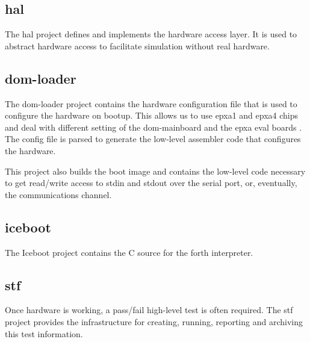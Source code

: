 \documentclass{article}
\begin{document}
	\subsection{hal}

The hal project defines and implements the hardware access layer.  
It is used to 
abstract hardware access to facilitate simulation
without real hardware.

	\subsection{dom-loader}

The dom-loader project contains the hardware configuration file that 
is used to configure the hardware on bootup.  This allows us to 
                         use epxa1 and epxa4 chips and
                          deal with different setting of the
                          dom-mainboard and the epxa eval boards
			\label{configfile}.  The config file is
parsed to generate the low-level assembler code that configures
the hardware.

This project also builds the boot image and contains the
low-level code necessary to get read/write access to stdin
and stdout over the serial port, or, eventually, the communications
channel.
			
	\subsection{iceboot}

The    Iceboot project contains the C source for
the forth interpreter.

	\subsection{stf}

Once hardware is working, a pass/fail high-level test
is often required.  The stf project provides the infrastructure
for creating, running, reporting and archiving this test
information.

\printindex
\end{document}
